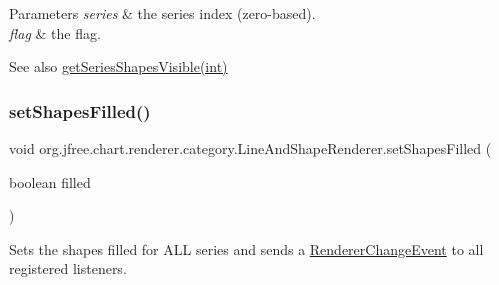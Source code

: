 \begin{DoxyParams}{Parameters}
{\em series} & the series index (zero-\/based). \\
\hline
{\em flag} & the flag.\\
\hline
\end{DoxyParams}
\begin{DoxySeeAlso}{See also}
\mbox{\hyperlink{classorg_1_1jfree_1_1chart_1_1renderer_1_1category_1_1_line_and_shape_renderer_af607c5d82294d4f53fb28935994c715d}{get\+Series\+Shapes\+Visible(int)}} 
\end{DoxySeeAlso}
\mbox{\label{classorg_1_1jfree_1_1chart_1_1renderer_1_1category_1_1_line_and_shape_renderer_ac5475316d084e8012226667e21b6c317}} 
\subsubsection{\texorpdfstring{set\+Shapes\+Filled()}{setShapesFilled()}\hspace{0.1cm}{\footnotesize\ttfamily [1/2]}}
{\footnotesize\ttfamily void org.\+jfree.\+chart.\+renderer.\+category.\+Line\+And\+Shape\+Renderer.\+set\+Shapes\+Filled (\begin{DoxyParamCaption}\item[{boolean}]{filled }\end{DoxyParamCaption})}

Sets the \textquotesingle{}shapes filled\textquotesingle{} for A\+LL series and sends a \mbox{\hyperlink{}{Renderer\+Change\+Event}} to all registered listeners.


